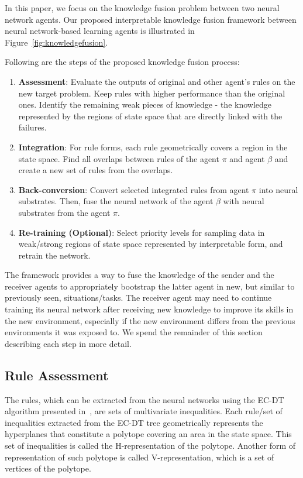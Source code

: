 \documentclass[lettersize,journal]{IEEEtran}
\begin{document}
In this paper, we focus on the knowledge fusion problem between two neural network agents. Our proposed interpretable knowledge fusion framework between neural network-based learning agents is illustrated in Figure~\ref{fig:knowledgefusion}.

Following are the steps of the proposed knowledge fusion process:
\begin{enumerate}
    \item \textbf{Assessment}: Evaluate the outputs of original and other agent\textquoteright s rules on the new target problem. Keep rules with higher performance than the original ones. Identify the remaining weak pieces of knowledge - the knowledge represented by the regions of state space that are directly linked with the failures.
    \item \textbf{Integration}: For rule forms, each rule geometrically covers a region in the state space. Find all overlaps between rules of the agent $\pi$ and agent $\beta$ and create a new set of rules from the overlaps.
    \item \textbf{Back-conversion}: Convert selected integrated rules from agent $\pi$ into neural substrates. Then, fuse the neural network of the agent $\beta$ with neural substrates from the agent $\pi$.
    \item \textbf{Re-training (Optional)}: Select priority levels for sampling data in weak/strong regions of state space represented by interpretable form, and retrain the network.
\end{enumerate}

The framework provides a way to fuse the knowledge of the sender and the receiver agents to appropriately bootstrap the latter agent in new, but similar to previously seen, situations/tasks. The receiver agent may need to continue training its neural network after receiving new knowledge to improve its skills in the new environment, especially if the new environment differs from the previous environments it was exposed to. We spend the remainder of this section describing each step in more detail.


\subsection{Rule Assessment}\label{jpaper2-methodology-fusion-assessment}
The rules, which can be extracted from the neural networks using the EC-DT algorithm presented in~\cite{nguyen2020towards}, are sets of multivariate inequalities. Each rule/set of inequalities extracted from the EC-DT tree geometrically represents the hyperplanes that constitute a polytope covering an area in the state space. This set of inequalities is called the H-representation of the polytope. Another form of representation of such polytope is called V-representation, which is a set of vertices of the polytope.
\end{document}
